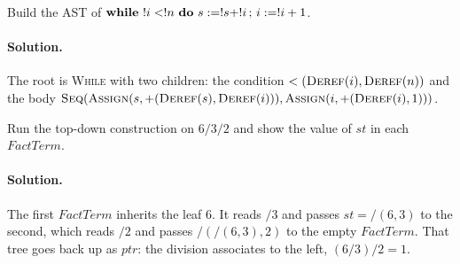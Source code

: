 \begin{exercise}
Build the AST of $\mathbf{while}\ !i<!n\ \mathbf{do}\ s := !s+!i \,;\, i := !i+1$.
\end{exercise}

\paragraph{Solution.} The root is \textsc{While} with two children: the
condition $<(\textsc{Deref}(i), \textsc{Deref}(n))$ and the body
$\textsc{Seq}(\textsc{Assign}(s, +(\textsc{Deref}(s), \textsc{Deref}(i))),
\textsc{Assign}(i, +(\textsc{Deref}(i), 1)))$.

\begin{exercise}
Run the top-down construction on $6 / 3 / 2$ and show the value of
$\mathit{st}$ in each $\mathit{FactTerm}$.
\end{exercise}

\paragraph{Solution.} The first $\mathit{FactTerm}$ inherits the leaf 6. It reads
$/ 3$ and passes $\mathit{st} = /(6, 3)$ to the second, which reads $/ 2$ and
passes $/(/(6, 3), 2)$ to the empty $\mathit{FactTerm}$. That tree goes back up as
$\mathit{ptr}$: the division associates to the left, $(6/3)/2 = 1$.
